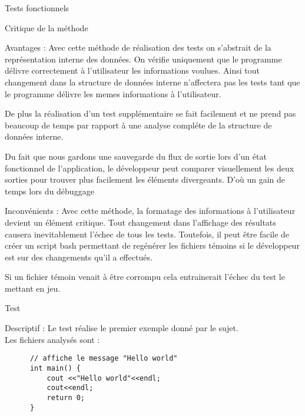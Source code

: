 \documentclass{article}
\begin{document}
\begin{section}{Tests fonctionnels}
 \begin{subsection}{Critique de la méthode}
    \begin{paragraph}{Avantages :}
      Avec cette méthode de réalisation des tests on s'abstrait de la représentation interne des données. On vérifie uniquement
      que le programme délivre correctement à l'utilisateur les informations voulues. Ainsi tout changement dans la structure de
      données interne n'affectera pas les tests tant que le programme délivre les memes informations à l'utilisateur.
      
      De plus la réalisation d'un test supplémentaire se fait facilement et ne prend pas beaucoup de temps par rapport à une analyse
      compléte de la structure de données interne.
      
      Du fait que nous gardons une sauvegarde du flux de sortie lors d'un état fonctionnel de l'application, le développeur peut 
      comparer visuellement les deux sorties pour trouver plus facilement les éléments divergeants. D'où un gain de temps lors du débuggage 
    \end{paragraph}

    \begin{paragraph}{Inconvénients :}
      Avec cette méthode, la formatage des informations à l'utilisateur devient un élément critique. Tout changement dans l'affichage des résultats causera
      inevitablement l'échec de tous les tests. Toutefois, il peut être facile de créer un script bash permettant de regénérer les fichiers témoins
      si le développeur est sur des changements qu'il a effectués.
      
      Si un fichier témoin venait à être corrompu cela entrainerait l'échec du test le mettant en jeu.
    \end{paragraph}
 \end{subsection}

  \newpage
  
  \begin{subsection}{Test }
    \begin{paragraph}{Descriptif :}
      Le test  réalise le premier exemple donné par le sujet.\\ Les fichiers analysés sont : 
      
      \begin{listing}[h!]
      \begin{verbatim}
	  // affiche le message "Hello world"
	  int main() {
	      cout <<"Hello world"<<endl;
	      cout<<endl;
	      return 0;
	  }
      \end{verbatim}
      \end{listing}
      

\end{paragraph}
\end{subsection}
\end{section}
\end{document}

